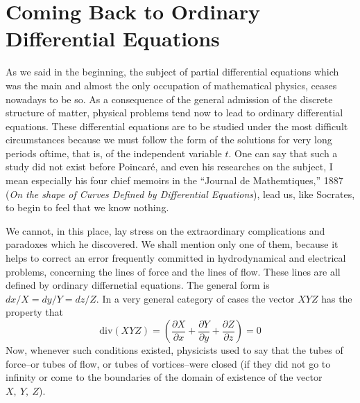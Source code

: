\documentclass[12pt,oneside]{book}
\newcommand{\iit}[1]{\textit{#1}}
\begin{document}
\section{Coming Back to Ordinary Differential Equations}
As we said in the beginning, the subject of partial differential equations which was the main and almost the only occupation of mathematical physics, ceases nowadays to be so. As a consequence of the general admission of the discrete structure of matter, physical problems tend now to lead to ordinary differential equations. These differential equations are to be studied under the most difficult circumstances because we must follow the form of the solutions for very long periods oftime, that is, of the independent variable $t$. One can say that such a study did not exist before Poincar\'e, and even his researches on the subject, I mean especially his four chief memoirs in the ``Journal de Mathemtiques,'' 1887 (\iit{On the shape of Curves Defined by Differential Equations}), lead us, like Socrates, to begin to feel that we know nothing. \par

We cannot, in this place, lay stress on the extraordinary complications and paradoxes which he discovered. We shall mention only one of them, because it helps to correct an error frequently committed in hydrodynamical and electrical problems, concerning the lines of force and the lines of flow. These lines are all defined by ordinary differnetial equations. The general form is $dx/X=dy/Y=dz/Z$. In a very general category of cases the vector $XYZ$ has the property that
\begin{equation*}
    \text{div}(XYZ)=\left(\frac{\partial X}{\partial x}+\frac{\partial Y}{\partial y}+\frac{\partial Z}{\partial z}\right)=0
\end{equation*}
Now, whenever such conditions existed, physicists used to say that the tubes of force--or tubes of flow, or tubes of vortices--were closed (if they did not go to infinity or come to the boundaries of the domain of existence of the vector $X,\ Y,\ Z$). \par
\end{document}
